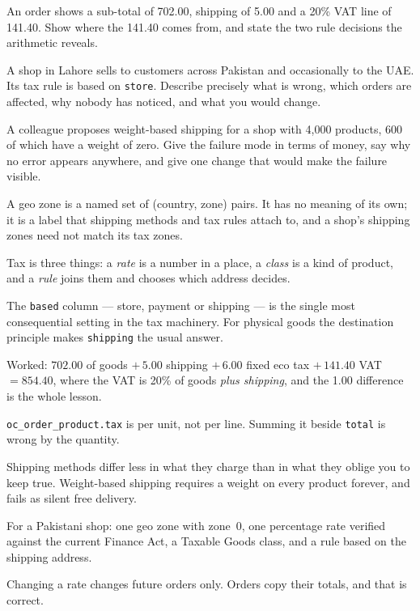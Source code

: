 \begin{checkpoint}
\begin{tightnum}
  \item An order shows a sub-total of 702.00, shipping of 5.00 and a 20\% VAT
        line of 141.40. Show where the 141.40 comes from, and state the two
        rule decisions the arithmetic reveals.
  \item A shop in Lahore sells to customers across Pakistan and occasionally to
        the UAE. Its tax rule is based on \texttt{store}. Describe precisely
        what is wrong, which orders are affected, why nobody has noticed, and
        what you would change.
  \item A colleague proposes weight-based shipping for a shop with 4{,}000
        products, 600 of which have a weight of zero. Give the failure mode in
        terms of money, say why no error appears anywhere, and give one change
        that would make the failure visible.
\end{tightnum}
\end{checkpoint}

\begin{chaptersummary}
\begin{tight}
  \item A geo zone is a named set of (country, zone) pairs. It has no meaning
        of its own; it is a label that shipping methods and tax rules attach
        to, and a shop's shipping zones need not match its tax zones.
  \item Tax is three things: a \emph{rate} is a number in a place, a
        \emph{class} is a kind of product, and a \emph{rule} joins them and
        chooses which address decides.
  \item The \texttt{based} column --- store, payment or shipping --- is the
        single most consequential setting in the tax machinery. For physical
        goods the destination principle makes \texttt{shipping} the usual
        answer.
  \item Worked: $702.00$ of goods $+\,5.00$ shipping $+\,6.00$ fixed eco tax
        $+\,141.40$ VAT $=854.40$, where the VAT is 20\% of goods
        \emph{plus shipping}, and the 1.00 difference is the whole lesson.
  \item \texttt{oc\_order\_product.tax} is per unit, not per line. Summing it
        beside \texttt{total} is wrong by the quantity.
  \item Shipping methods differ less in what they charge than in what they
        oblige you to keep true. Weight-based shipping requires a weight on
        every product forever, and fails as silent free delivery.
  \item For a Pakistani shop: one geo zone with zone~0, one percentage rate
        verified against the current Finance Act, a Taxable Goods class, and a
        rule based on the shipping address.
  \item Changing a rate changes future orders only. Orders copy their totals,
        and that is correct.
\end{tight}
\end{chaptersummary}

